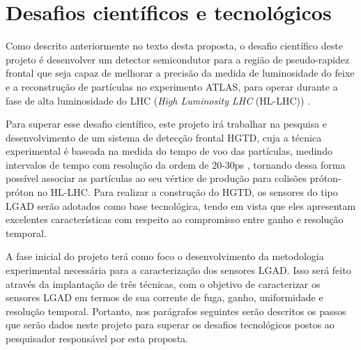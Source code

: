 \chapter{Desafios científicos e tecnológicos}

Como descrito anteriormente no texto desta proposta, o desafio científico deste projeto é desenvolver um detector semicondutor para a região de pseudo-rapidez frontal que seja capaz de melhorar a precisão da medida de luminosidade do feixe e a reconstrução de partículas no experimento ATLAS, para operar durante a fase de alta luminosidade do LHC ({\it High Luminosity LHC} (HL-LHC)) \cite{HL_LHC,tdr}. 

Para superar esse desafio científico, este projeto irá trabalhar na pesquisa e desenvolvimento de um sistema de detecção frontal HGTD, cuja a técnica experimental é baseada na medida do tempo de voo das partículas, medindo intervalos de tempo com resolução da ordem de 20-30ps \cite{tdr}, tornando dessa forma possível associar as partículas ao seu vértice de produção para colisões próton-próton no HL-LHC. Para realizar a construção do HGTD, os sensores do tipo LGAD serão adotados como base tecnológica, tendo em vista que eles apresentam excelentes características com respeito ao compromisso entre ganho e resolução temporal. 
\thispagestyle{plain}

A fase inicial do projeto terá como foco o desenvolvimento da metodologia experimental necessária para a caracterização dos sensores LGAD. Isso será feito através da implantação de três técnicas, com o objetivo de caracterizar os sensores LGAD em termos de sua corrente de fuga, ganho, uniformidade e resolução temporal. Portanto, nos parágrafos seguintes serão descritos os passos que serão dados neste projeto para superar os desafios tecnológicos postos ao pesquisador responsável por esta proposta. 


